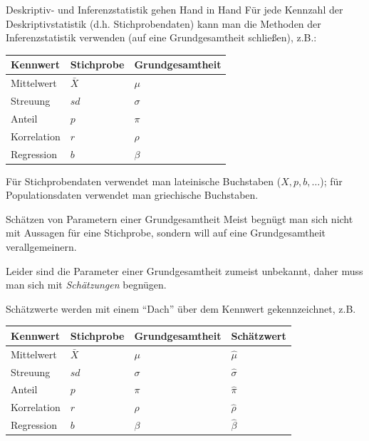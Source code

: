 \documentclass[
  ngerman,
  ignorenonframetext,
]{beamer}
\begin{document}
\begin{frame}{Deskriptiv- und Inferenzstatistik gehen Hand in Hand}
\protect\hypertarget{deskriptiv--und-inferenzstatistik-gehen-hand-in-hand}{}
Für jede Kennzahl der Deskriptivstatistik (d.h. Stichprobendaten) kann
man die Methoden der Inferenzstatistik verwenden (auf eine
Grundgesamtheit schließen), z.B.:

\begin{table}
\centering
\begin{tabular}{l|l|l}
\hline
Kennwert & Stichprobe & Grundgesamtheit\\
\hline
Mittelwert & $\bar{X}$ & $\mu$\\
\hline
Streuung & $sd$ & $\sigma$\\
\hline
Anteil & $p$ & $\pi$\\
\hline
Korrelation & $r$ & $\rho$\\
\hline
Regression & $b$ & $\beta$\\
\hline
\end{tabular}
\end{table}

Für Stichprobendaten verwendet man lateinische Buchstaben
(\(X, p, b, \ldots\)); für Populationsdaten verwendet man griechische
Buchstaben.
\end{frame}

\begin{frame}{Schätzen von Parametern einer Grundgesamtheit}
\protect\hypertarget{schuxe4tzen-von-parametern-einer-grundgesamtheit}{}
Meist begnügt man sich nicht mit Aussagen für eine Stichprobe, sondern
will auf eine Grundgesamtheit verallgemeinern.

Leider sind die Parameter einer Grundgesamtheit zumeist unbekannt, daher
muss man sich mit \emph{Schätzungen} begnügen.

Schätzwerte werden mit einem ``Dach'' über dem Kennwert gekennzeichnet,
z.B.

\begin{table}
\centering
\begin{tabular}{l|l|l|l}
\hline
Kennwert & Stichprobe & Grundgesamtheit & Schätzwert\\
\hline
Mittelwert & $\bar{X}$ & $\mu$ & $\hat{\mu}$\\
\hline
Streuung & $sd$ & $\sigma$ & $\hat{\sigma}$\\
\hline
Anteil & $p$ & $\pi$ & $\hat{\pi}$\\
\hline
Korrelation & $r$ & $\rho$ & $\hat{\rho}$\\
\hline
Regression & $b$ & $\beta$ & $\hat{\beta}$\\
\hline
\end{tabular}
\end{table}
\end{frame}
\end{document}
